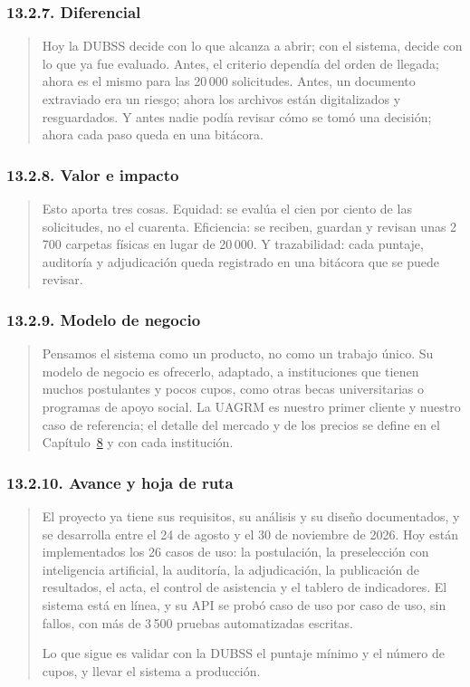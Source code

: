 \subsubsection{13.2.7. Diferencial}

\begin{quote}
Hoy la DUBSS decide con lo que alcanza a abrir; con el sistema, decide con lo que ya fue evaluado. Antes, el criterio dependía del orden de llegada; ahora es el mismo para las 20\,000 solicitudes. Antes, un documento extraviado era un riesgo; ahora los archivos están digitalizados y resguardados. Y antes nadie podía revisar cómo se tomó una decisión; ahora cada paso queda en una bitácora.
\end{quote}

\subsubsection{13.2.8. Valor e impacto}

\begin{quote}
Esto aporta tres cosas. Equidad: se evalúa el cien por ciento de las solicitudes, no el cuarenta. Eficiencia: se reciben, guardan y revisan unas 2\,700 carpetas físicas en lugar de 20\,000. Y trazabilidad: cada puntaje, auditoría y adjudicación queda registrado en una bitácora que se puede revisar.
\end{quote}

\subsubsection{13.2.9. Modelo de negocio}

\begin{quote}
Pensamos el sistema como un producto, no como un trabajo único. Su modelo de negocio es ofrecerlo, adaptado, a instituciones que tienen muchos postulantes y pocos cupos, como otras becas universitarias o programas de apoyo social. La UAGRM es nuestro primer cliente y nuestro caso de referencia; el detalle del mercado y de los precios se define en el Capítulo~\hyperref[cap:mercado]{8} y con cada institución.
\end{quote}

\subsubsection{13.2.10. Avance y hoja de ruta}

\begin{quote}
El proyecto ya tiene sus requisitos, su análisis y su diseño documentados, y se desarrolla entre el 24 de agosto y el 30 de noviembre de 2026. Hoy están implementados los 26 casos de uso: la postulación, la preselección con inteligencia artificial, la auditoría, la adjudicación, la publicación de resultados, el acta, el control de asistencia y el tablero de indicadores. El sistema está en línea, y su API se probó caso de uso por caso de uso, sin fallos, con más de 3\,500 pruebas automatizadas escritas.

Lo que sigue es validar con la DUBSS el puntaje mínimo y el número de cupos, y llevar el sistema a producción.
\end{quote}

